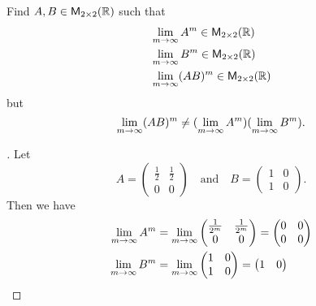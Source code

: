 \begin{ex}\label{ex:5.3.5}
  Find \(A, B \in \ms[2][2][\R]\) such that
  \begin{align*}
     & \Lim_{m \to \infty} A^m \in \ms[2][2][\R]    \\
     & \Lim_{m \to \infty} B^m \in \ms[2][2][\R]    \\
     & \Lim_{m \to \infty} (AB)^m \in \ms[2][2][\R]
  \end{align*}
  but
  \[
    \lim\limits_{m \to \infty} (AB)^m \neq (\lim\limits_{m \to \infty} A^m) (\lim\limits_{m \to \infty} B^m).
  \]
\end{ex}

\begin{proof}[]
  Let
  \[
    A = \begin{pmatrix}
      \frac{1}{2} & \frac{1}{2} \\
      0           & 0
    \end{pmatrix} \quad \text{and} \quad B = \begin{pmatrix}
      1 & 0 \\
      1 & 0
    \end{pmatrix}.
  \]
  Then we have
  \begin{align*}
    \lim\limits_{m \to \infty} A^m    & = \lim\limits_{m \to \infty} \begin{pmatrix}
                                                         \frac{1}{2^m} & \frac{1}{2^m} \\
                                                         0             & 0
                                                       \end{pmatrix} = \begin{pmatrix}
                                                                         0 & 0 \\
                                                                         0 & 0
                                                                       \end{pmatrix} \\
    \lim\limits_{m \to \infty} B^m    & = \lim\limits_{m \to \infty} \begin{pmatrix}
                                                         1 & 0 \\
                                                         1 & 0
                                                       \end{pmatrix} = \begin{pmatrix}
                                                                         1 & 0 \\

\end{pmatrix}
\end{align*}
\end{proof}
